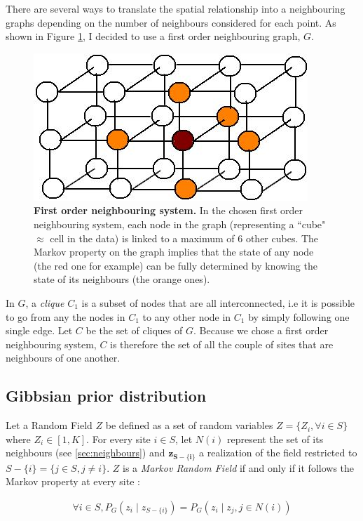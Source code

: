 There are several ways to translate the spatial relationship into a neighbouring graphs depending on the number of neighbours considered for each point. As shown in Figure \ref{fig:graph}, I decided to use a first order neighbouring graph, $G$.\\

	\begin{figure}[h]
\centerline{\includegraphics[width=0.5\linewidth]{gfx/chapter4/graph.jpg}}
\caption{{\bf First order neighbouring system.} In the chosen first order neighbouring system, each node in the graph (representing a ``cube" $\approx$ cell in the data) is linked to a maximum of 6 other cubes. The Markov property on the graph implies that the state of any node (the red one for example) can be fully determined by knowing the state of its neighbours (the orange ones).}\label{fig:graph}
	\end{figure}

In $G$, a \emph{clique} $C_1$ is a subset of nodes that are all interconnected, i.e it is possible to go from any the nodes in $C_1$ to any other node in $C_1$ by simply following one single edge. Let $C$ be the set of cliques of $G$. Because we chose a first order neighbouring system, $C$ is therefore the set of all the couple of sites that are neighbours of one another.

	\subsection{Gibbsian prior distribution}
Let a Random Field $Z$ be defined as a set of random variables $Z = \{Z_i , \forall i \in S\}$ where $Z_i \in [1,K]$. For every site $i \in S$, let $N(i)$ represent the set of its neighbours (see \ref{sec:neighbours}) and $\boldsymbol{z_{S-\{i\}}}$ a realization of the field restricted to $S-\{i\} = \{j \in S, j \neq i\}$. $Z$ is a \emph{Markov Random Field} if and only if it follows the Markov property at every site :

\begin{align}
\label{eq:markov1}
\forall i \in S, P_G (z_i \mid z_{S-\{i\}}) = P_G (z_i \mid z_j , j \in N(i))
\end{align}

